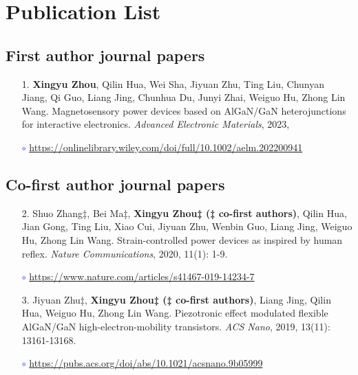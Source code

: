 \chapter{Publication List}


\section*{First author journal papers}

\begin{itemize}
	\item [1.] 
	\textbf{Xingyu Zhou}, Qilin Hua, Wei Sha, Jiyuan Zhu, Ting Liu, Chunyan Jiang, Qi Guo, Liang Jing, Chunhua Du, Junyi Zhai, Weiguo Hu, Zhong Lin Wang. Magnetosensory power devices based on AlGaN/GaN heterojunctions for interactive electronics. \textit{Advanced Electronic Materials}, 2023,
	
	\textcolor{blue}{$\circ$} \url{https://onlinelibrary.wiley.com/doi/full/10.1002/aelm.202200941}

\end{itemize}

\section*{Co-first author journal papers}

\begin{itemize}
	\item [2.] 
	Shuo Zhang‡, Bei Ma‡, \textbf{Xingyu Zhou‡ (‡ co-first authors)}, Qilin Hua, Jian Gong, Ting Liu, Xiao Cui, Jiyuan Zhu, Wenbin Guo, Liang Jing, Weiguo Hu, Zhong Lin Wang. Strain-controlled power devices as inspired by human reflex. \textit{Nature Communications}, 2020, 11(1): 1-9.
	
	\textcolor{blue}{$\circ$} \url{https://www.nature.com/articles/s41467-019-14234-7}
	
	\item [3.] 
	Jiyuan Zhu‡, \textbf{Xingyu Zhou‡ (‡ co-first authors)}, Liang Jing, Qilin Hua, Weiguo Hu, Zhong Lin Wang. Piezotronic effect modulated flexible AlGaN/GaN high-electron-mobility transistors. \textit{ACS Nano}, 2019, 13(11): 13161-13168.
	
	\textcolor{blue}{$\circ$} \url{https://pubs.acs.org/doi/abs/10.1021/acsnano.9b05999}
\end{itemize}



